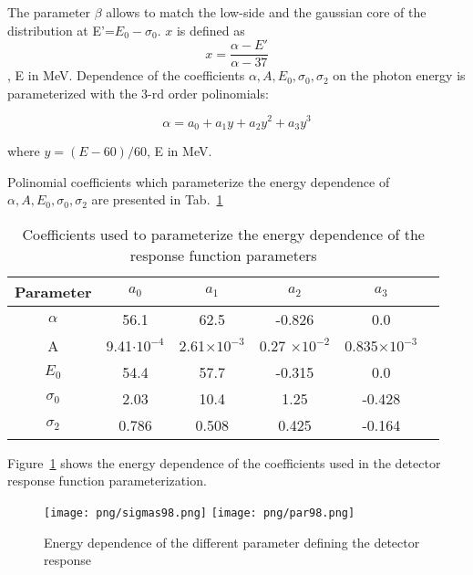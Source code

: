 The parameter $\beta$  allows to match the low-side and the gaussian core
of the distribution at E'=$E_0-\sigma_0$.
$x$ is defined as
$$
  x= \frac{\alpha- E'}{\alpha -37} 
$$, E in MeV.
Dependence of the coefficients $\alpha, A, E_0, \sigma_0, \sigma_2$ on the photon energy
is parameterized with the 3-rd order polinomials:

\begin{equation}
  \alpha= a_0+a_1y+a_2y^2+a_3y^3
\end{equation}

where $y= (E-60)/60$, E in MeV.

Polinomial coefficients which parameterize the energy dependence of
$\alpha, A, E_0, \sigma_0, \sigma_2$ are presented in Tab.~\ref{tab:param98}

\begin{table}[!h] \label{tab:param98}
  \begin{center}
    \begin{tabular}{| c | c | c | c | c | c | }
      \hline
      Parameter  & $a_0$              & $a_1$ & $a_2$ & $a_3$ \\ \hline
      $\alpha$   & 56.1               &62.5 & -0.826 & 0.0  \\ \hline
      A          & 9.41$\cdot 10^{-4}$ & 2.61$\times 10^{-3}$ &0.27 $\times 10^{-2}$ &0.835$\times 10^{-3}$   \\ \hline
      $E_0$      & 54.4               & 57.7 & -0.315 &0.0 \\ \hline
      $\sigma_0$ & 2.03               &10.4 &1.25 & -0.428\\ \hline
      $\sigma_2$ & 0.786              & 0.508 & 0.425 & -0.164\\ \hline
    \end{tabular}
  \end{center}
  \caption{Coefficients used to parameterize the energy dependence of the response function parameters}
\end{table}

Figure~\ref{fig:parameters98} shows the energy dependence of the coefficients used
in the detector response function parameterization.

\begin{figure}[!h]
  \begin{center}
    \texttt{[image: png/sigmas98.png]} 
    \texttt{[image: png/par98.png]} 
  \end{center}
  \caption{Energy dependence of the different parameter defining the detector response}
  \label{fig:parameters98}
\end{figure}

